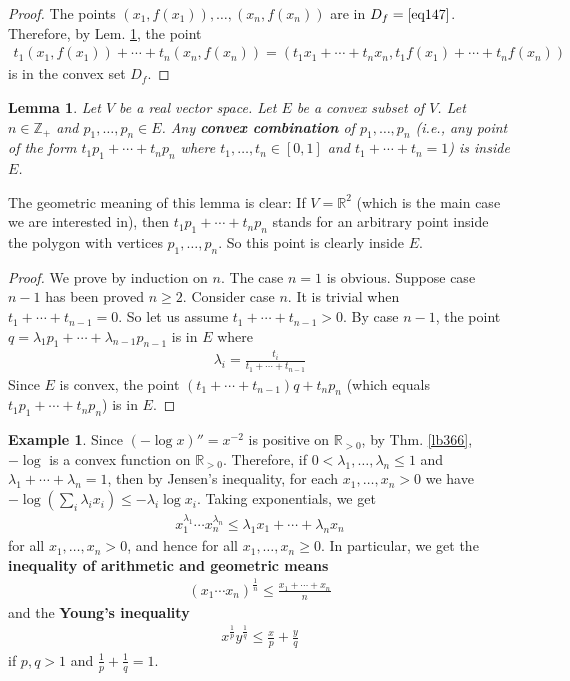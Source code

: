 \documentclass[12pt,b5paper,notitlepage]{article}
\theoremstyle{definition}
\newtheorem{eg}[df]{Example}
\theoremstyle{plain}
\newtheorem{lm}[df]{Lemma}
\newcommand{\Zbb}{\mathbb Z}
\newcommand{\Rbb}{\mathbb R}
\numberwithin{equation}{section}
\begin{document}
\begin{proof}
The points $(x_1,f(x_1)),\dots,(x_n,f(x_n))$ are in $D_f=\eqref{eq147}$. Therefore, by Lem. \ref{lb365}, the point
\begin{align*}
t_1(x_1,f(x_1))+\cdots+t_n(x_n,f(x_n))=(t_1x_1+\cdots+t_nx_n,t_1f(x_1)+\cdots+t_nf(x_n))
\end{align*}
is in the convex set $D_f$. 
\end{proof}



\begin{lm}\label{lb365}
Let $V$ be a real vector space. Let $E$ be a convex subset of $V$. Let $n\in\Zbb_+$ and $p_1,\dots,p_n\in E$. Any \textbf{convex combination} of $p_1,\dots,p_n$  (i.e., any point of the form $t_1p_1+\cdots+t_np_n$ where $t_1,\dots,t_n\in[0,1]$ and $t_1+\cdots+t_n=1$) is inside $E$.
\end{lm}

The geometric meaning of this lemma is clear: If $V=\Rbb^2$ (which is the main case we are interested in), then $t_1p_1+\cdots+t_np_n$ stands for an arbitrary point inside the polygon with vertices $p_1,\dots,p_n$. So this point is clearly inside $E$.


\begin{proof}
We prove by induction on $n$. The case $n=1$ is obvious. Suppose case $n-1$ has been proved $n\geq 2$. Consider case $n$. It is trivial when $t_1+\cdots+t_{n-1}=0$. So let us assume $t_1+\cdots+t_{n-1}>0$. By case $n-1$, the point $q=\lambda_1 p_1+\cdots+\lambda_{n-1}p_{n-1}$ is in $E$ where
\begin{align*}
\lambda_i=\frac{t_i}{t_1+\cdots+t_{n-1}}
\end{align*}
Since $E$ is convex, the point $(t_1+\cdots+t_{n-1})q+t_np_n$ (which equals $t_1p_1+\cdots+t_np_n$) is in $E$.
\end{proof}


\begin{eg}
Since $(-\log x)''=x^{-2}$ is positive on $\Rbb_{>0}$, by Thm. \ref{lb366}, $-\log$ is a convex function on $\Rbb_{>0}$. Therefore, if $0<\lambda_1,\dots,\lambda_n\leq 1$ and $\lambda_1+\cdots+\lambda_n=1$, then by Jensen's inequality, for each $x_1,\dots,x_n>0$ we have $-\log(\sum_i\lambda_ix_i)\leq -\lambda_i\log x_i$. Taking exponentials, we get
\begin{align*}
x_1^{\lambda_1}\cdots x_n^{\lambda_n}\leq \lambda_1x_1+\cdots+\lambda_n x_n
\end{align*}
for all $x_1,\dots,x_n>0$, and hence for all $x_1,\dots,x_n\geq0$. In particular, we get the \textbf{inequality of arithmetic and geometric means}
\begin{align}
(x_1\cdots x_n)^{\frac 1n}\leq \frac{x_1+\cdots+x_n}{n}
\end{align}
and the \textbf{Young's inequality} 
\begin{align}
x^{\frac 1p}y^{\frac 1q}\leq \frac xp+\frac yq
\end{align}
if $p,q>1$ and $\frac 1p+\frac 1q=1$.
\end{eg}
\end{document}
